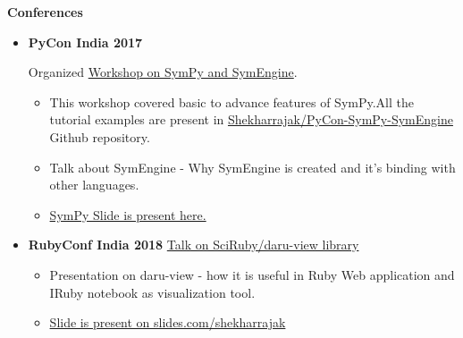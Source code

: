 \documentclass[letterpaper,12pt]{article}[leftmargin=*]
\def \entryspacing {-0pt}
\renewcommand{\section}[2]{\vspace{5pt}
  \colorbox{secondary}{\color{white}\raggedbottom\normalsize\textbf{{#1}{\hspace{7pt}#2}}}
}
\newcommand{\resumeEntryStart}{\begin{itemize}[leftmargin=2.5mm]}
\newcommand{\resumeEntryEnd}{\end{itemize}\vspace{\entryspacing}}
\newcommand{\resumeEntryS}[2]{
  \item[]\small{
    \textbf{\color{primary}#1 }{ #2 \vspace{-6pt}}
  }
}
\begin{document}
\section{\faBook}{Conferences}
 \resumeEntryStart
  \resumeEntryS{PyCon India 2017} {Organized \href{https://shekharrajak.github.io/blog/Talks/SymPy/PyConIndia-Delhi-2017}{ Workshop on SymPy and SymEngine}. 
  \begin{itemize}
      \item This workshop covered basic to advance features of SymPy.All the tutorial examples are present in \href{https://github.com/Shekharrajak/PyCon-SymPy-SymEngine}{Shekharrajak/PyCon-SymPy-SymEngine} Github repository.
      
      \item Talk about SymEngine - Why SymEngine is created and it's binding with other languages.
      
      \item \href{https://shekharrajak.github.io/PyCon-SymPy-SymEngine/slides-pyconindia2017}{SymPy Slide is present here. }
  \end{itemize}}

  \resumeEntryS{RubyConf India 2018 } {\href{https://shekharrajak.github.io/blog/Talks/SciRuby/RubyConfIndia-Bangalore-2018}{Talk
on SciRuby/daru-view library}}
\begin{itemize}
    \item Presentation on daru-view - how it is useful in Ruby Web application and IRuby notebook as visualization tool.
    \item \href{https://slides.com/shekharrajak/beauty-of-javascript-charts-using-daru-view}{Slide is present on slides.com/shekharrajak}
\end{itemize}

 \resumeEntryEnd
 
\end{document}

